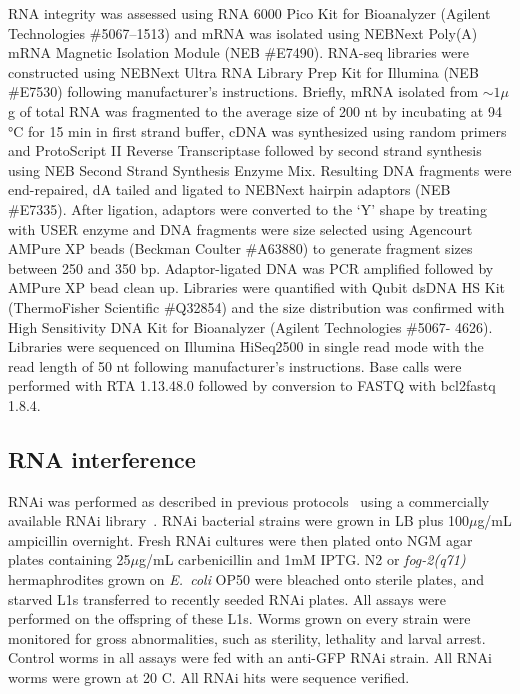 \documentclass[10pt,letterpaper,twocolumn]{article}
\newcommand{\fog}{\emph{fog-2}}
\newcommand{\ecol}{\emph{E.~coli}}
\begin{document}
RNA integrity was assessed using RNA 6000 Pico Kit for Bioanalyzer (Agilent Technologies \#5067--1513) and mRNA was isolated using NEBNext Poly(A) mRNA Magnetic Isolation Module (NEB \#E7490). RNA-seq libraries were constructed using NEBNext Ultra RNA Library Prep Kit for Illumina (NEB \#E7530) following manufacturer’s instructions. Briefly, mRNA isolated from $\sim1\mu$g of total RNA was fragmented to the average size of 200 nt by incubating at 94 °C for 15 min in first strand buffer, cDNA was synthesized using random primers and ProtoScript II Reverse Transcriptase followed by second strand synthesis using NEB Second Strand Synthesis Enzyme Mix. Resulting DNA fragments were end-repaired, dA tailed and ligated to NEBNext hairpin adaptors (NEB \#E7335).
After ligation, adaptors were converted to the ‘Y’ shape by treating with USER enzyme and DNA fragments were size selected using Agencourt AMPure XP beads (Beckman Coulter \#A63880) to generate fragment sizes between 250 and 350 bp. Adaptor-ligated DNA was PCR amplified followed by AMPure XP bead clean up. Libraries were quantified with Qubit dsDNA HS Kit (ThermoFisher Scientific \#Q32854) and the size distribution was confirmed with High Sensitivity DNA Kit for Bioanalyzer (Agilent Technologies \#5067- 4626).
Libraries were sequenced on Illumina HiSeq2500 in single read mode with the read length of 50 nt following manufacturer's instructions. Base calls were performed with RTA 1.13.48.0 followed by conversion to FASTQ with bcl2fastq 1.8.4.


\subsection*{RNA interference}
\label{sb:rnai}
RNAi was performed as described in previous protocols~\cite{Kamath2001} using a commercially available RNAi library~\cite{Kamath2003}. RNAi bacterial strains were grown in LB plus 100$\mu$g/mL ampicillin overnight. Fresh RNAi cultures were then plated onto NGM agar plates containing 25$\mu$g/mL carbenicillin and 1mM IPTG\@. N2 or \fog{}\emph{(q71)} hermaphrodites grown on \ecol{} OP50 were bleached onto sterile plates, and starved L1s transferred to recently seeded RNAi plates.
All assays were performed on the offspring of these L1s. Worms grown on every strain were monitored for gross abnormalities, such as sterility, lethality and larval arrest. Control worms in all assays were fed with an anti-GFP RNAi strain. All RNAi worms were grown at 20\degree{} C. All RNAi hits were sequence verified.
\end{document}
